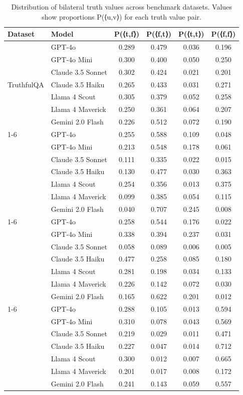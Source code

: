 \begin{table}[htbp]
\centering
\caption{Distribution of bilateral truth values across benchmark datasets. Values show proportions P(⟨u,v⟩) for each truth value pair.}
\begin{tabular}{llcccc}
\toprule
\textbf{Dataset} & \textbf{Model} & \textbf{P(⟨t,f⟩)} & \textbf{P(⟨f,t⟩)} & \textbf{P(⟨t,t⟩)} & \textbf{P(⟨f,f⟩)} \\
\midrule
\multirow{7}{*}{TruthfulQA}
 & GPT-4o & 0.289 & 0.479 & 0.036 & 0.196 \\
 & GPT-4o Mini & 0.300 & 0.400 & 0.050 & 0.250 \\
 & Claude 3.5 Sonnet & 0.302 & 0.424 & 0.021 & 0.201 \\
 & Claude 3.5 Haiku & 0.265 & 0.433 & 0.031 & 0.271 \\
 & Llama 4 Scout & 0.305 & 0.379 & 0.052 & 0.258 \\
 & Llama 4 Maverick & 0.250 & 0.361 & 0.064 & 0.207 \\
 & Gemini 2.0 Flash & 0.226 & 0.512 & 0.072 & 0.190 \\
\cline{1-6}
\multirow{7}{*}{SimpleQA}
 & GPT-4o & 0.255 & 0.588 & 0.109 & 0.048 \\
 & GPT-4o Mini & 0.213 & 0.548 & 0.178 & 0.061 \\
 & Claude 3.5 Sonnet & 0.111 & 0.335 & 0.022 & 0.015 \\
 & Claude 3.5 Haiku & 0.130 & 0.477 & 0.030 & 0.363 \\
 & Llama 4 Scout & 0.254 & 0.356 & 0.013 & 0.375 \\
 & Llama 4 Maverick & 0.099 & 0.385 & 0.054 & 0.115 \\
 & Gemini 2.0 Flash & 0.040 & 0.707 & 0.245 & 0.008 \\
\cline{1-6}
\multirow{7}{*}{MMLU-Pro}
 & GPT-4o & 0.258 & 0.544 & 0.176 & 0.022 \\
 & GPT-4o Mini & 0.338 & 0.394 & 0.237 & 0.031 \\
 & Claude 3.5 Sonnet & 0.058 & 0.089 & 0.006 & 0.005 \\
 & Claude 3.5 Haiku & 0.477 & 0.258 & 0.085 & 0.180 \\
 & Llama 4 Scout & 0.281 & 0.198 & 0.034 & 0.133 \\
 & Llama 4 Maverick & 0.226 & 0.142 & 0.072 & 0.030 \\
 & Gemini 2.0 Flash & 0.165 & 0.622 & 0.201 & 0.012 \\
\cline{1-6}
\multirow{7}{*}{FACTScore}
 & GPT-4o & 0.288 & 0.105 & 0.013 & 0.594 \\
 & GPT-4o Mini & 0.310 & 0.078 & 0.043 & 0.569 \\
 & Claude 3.5 Sonnet & 0.219 & 0.029 & 0.011 & 0.471 \\
 & Claude 3.5 Haiku & 0.227 & 0.047 & 0.014 & 0.712 \\
 & Llama 4 Scout & 0.300 & 0.012 & 0.007 & 0.665 \\
 & Llama 4 Maverick & 0.201 & 0.017 & 0.008 & 0.172 \\
 & Gemini 2.0 Flash & 0.241 & 0.143 & 0.059 & 0.557 \\
\bottomrule
\end{tabular}
\end{table}

